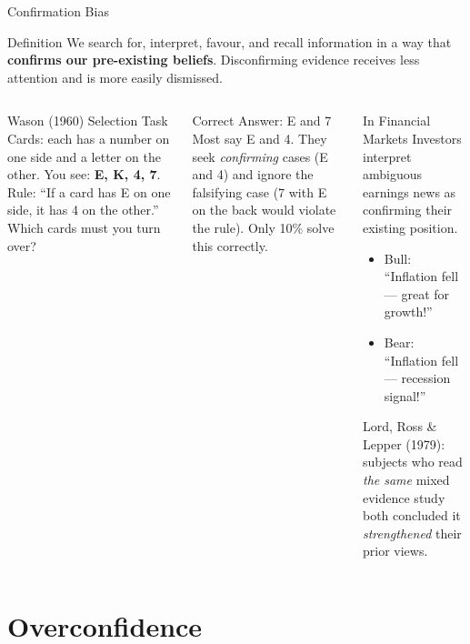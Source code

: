 \documentclass[aspectratio=169]{beamer}
\begin{document}
\begin{frame}{Confirmation Bias}
\begin{block}{Definition}
We search for, interpret, favour, and recall information in a way that \textbf{confirms our pre-existing beliefs}. Disconfirming evidence receives less attention and is more easily dismissed.
\end{block}
\begin{columns}
\begin{exampleblock}{Wason (1960) Selection Task}
Cards: each has a number on one side and a letter on the other. You see: \textbf{E, K, 4, 7}. Rule: ``If a card has E on one side, it has 4 on the other.'' Which cards must you turn over?
\end{exampleblock}
\pause
\begin{block}{Correct Answer: E and 7}
Most say E and 4. They seek \textit{confirming} cases (E and 4) and ignore the falsifying case (7 with E on the back would violate the rule). Only 10\% solve this correctly.
\end{block}
\begin{alertblock}{In Financial Markets}
Investors interpret ambiguous earnings news as confirming their existing position.
\begin{itemize}
  \item Bull: ``Inflation fell --- great for growth!''
  \item Bear: ``Inflation fell --- recession signal!''
\end{itemize}
Lord, Ross \& Lepper (1979): subjects who read \textit{the same} mixed evidence study both concluded it \textit{strengthened} their prior views.
\end{alertblock}
\end{columns}
\end{frame}

\section{Overconfidence}
\end{document}
